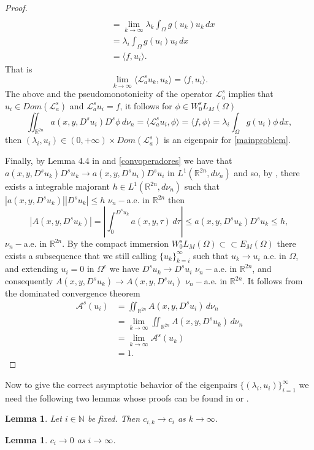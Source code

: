 \documentclass{amsart}
\newcommand{\A}{\mathcal{L}_a^s}
\newcommand{\R}{{\mathbb R}}
\newcommand{\N}{{\mathbb N}}
\newcommand{\EE}{{\mathcal A}^s}
\newtheorem{lema}[teo]{Lemma}
\theoremstyle{remark}
\theoremstyle{definition}
\numberwithin{equation}{section}
\begin{document}
\begin{proof}
\begin{align*}
\\
&=\lim_{k\to\infty}\lambda_k \int_\Omega g(u_k)u_k\,dx
\\
&=\lambda_i\int_\Omega g(u_i)u_i\,dx
\\
&=\langle f,u_i \rangle.
\end{align*}
That is
\begin{equation}\label{convoperadores}
\lim_{k\to\infty} \langle \A u_k,u_k \rangle	= \langle f,u_i \rangle.
\end{equation}
The above and the pseudomonotonicity of the operator $\A$ implies that $u_i\in Dom(\A)$ and $\A u_i=f$, it follows for $\phi\in W_0^s L_M(\Omega)$
$$
\iint_{\R^{2n}}a(x,y,D^s u_i)D^s \phi\,d\nu_n=\langle \A u_i,\phi \rangle=\langle f,\phi\rangle=\lambda_i	\int_\Omega  g(u_i)\phi\,dx,
$$ 
then $(\lambda_i,u_i)\in (0,+\infty)\times Dom(\A)$ is an eigenpair for \eqref{mainproblem}.

Finally, by Lemma 4.4 in \cite{FBSP} and \eqref{convoperadores} we have that $a(x,y,D^s u_k)D^s u_k\to a(x,y,D^s u_i)D^s u_i$ in $L^1(\R^{2n},d\nu_n)$ and so, by \cite[Theorem 4.9]{brezis}, there exists a integrable majorant $h\in L^1(\R^{2n},d\nu_n)$ such that $|a(x,y,D^s u_k)||D^s u_k|\leq h$ $\nu_n-$a.e. in $\R^{2n}$  then 
$$
|A(x,y,D^s u_k)|=\left | \int_0^{D^s u_k}a(x,y,\tau)\,d\tau\right |\leq a(x,y,D^s u_k)D^s u_k\leq h,
$$
$\nu_n-$a.e. in $\R^{2n}$. By the compact immersion $W^s_0 L_M(\Omega)\subset \subset E_M(\Omega)$ there exists a subsequence that we still calling $\{u_k\}_{k=i}^\infty$ such that $u_k\to u_i$ a.e. in $\Omega$, and extending $u_i=0$ in $\Omega^c$ we have $D^su_k\to D^s u_i$ $\nu_n-$a.e. in $\R^{2n}$, and consequently $A(x,y,D^s u_k)\to A(x,y,D^s u_i)$ $\nu_n-$a.e. in $\R^{2n}$. It follows from the dominated convergence theorem
\begin{align*}
\EE(u_i)&=\iint_{\R^{2n}} A(x,y,D^s u_i)\,d\nu_n	
\\
&=\lim_{k\to\infty}\iint_{\R^{2n}}A(x,y,D^s u_k)\,d\nu_n
\\
&=\lim_{k\to\infty}\EE(u_k)
\\
&=1.
\end{align*}
\end{proof}
Now to give the correct asymptotic behavior of the eigenpairs $\{(\lambda_i,u_i)\}_{i=1}^\infty$ we need the following two lemmas whose proofs can be found in \cite{FBSP} or \cite{Ti}.
\begin{lema}
	\label{ciktoci}
Let $i\in\N$ be fixed. Then $c_{i,k}\to c_i$ as $k\to\infty$.
\end{lema}
\begin{lema}\label{cito0}
$c_i\to 0$ as $i\to \infty$.
\end{lema}
\end{document}
